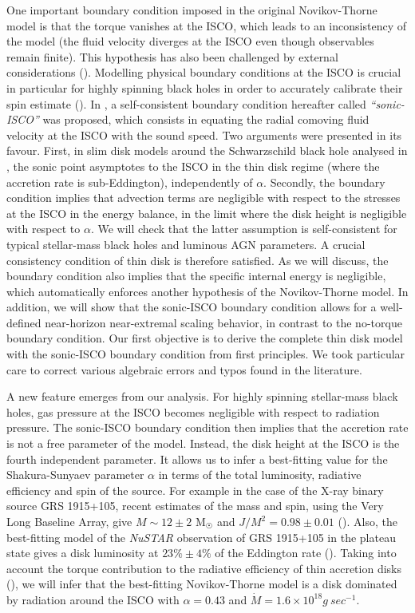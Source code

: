 \documentclass[a4paper,fleqn,usenatbib]{mnrasMOD}
\numberwithin{equation}{section}
\begin{document}
One important boundary condition imposed in the original Novikov-Thorne model is that the torque vanishes at the ISCO, which leads to an inconsistency of the model (the fluid velocity diverges at the ISCO even though observables remain finite). This hypothesis has also been challenged by external considerations (\cite{1999ApJ...515L..73K,1999ApJ...522L..57G,2000ApJ...533L.115L,2010ApJ...711..959N}). Modelling physical boundary conditions at the ISCO is crucial in particular for highly spinning black holes in order to accurately calibrate their spin estimate (\cite{Li:2004aq}).  In \cite{Penna:2011rw}, a self-consistent boundary condition hereafter called \emph{``sonic-ISCO''} was proposed, which consists in equating the radial comoving fluid velocity at the ISCO with the sound speed. Two arguments were presented in its favour. First, in slim disk models around the Schwarzschild black hole analysed in \cite{Abramowicz:2010nk}, the sonic point asymptotes to the ISCO in the thin disk regime (where the accretion rate is sub-Eddington), independently of $\alpha$. Secondly, the boundary condition implies that advection terms are negligible with respect to the stresses at the ISCO in the energy balance, in the limit where the disk height is negligible with respect to $\alpha$. We will check that the latter assumption is self-consistent for typical stellar-mass black holes and luminous AGN parameters. A crucial consistency condition of thin disk is therefore satisfied. As we will discuss, the boundary condition also implies that the specific internal energy is negligible, which automatically enforces another hypothesis of the Novikov-Thorne model. In addition, we will show that the sonic-ISCO boundary condition allows for a well-defined near-horizon near-extremal scaling behavior, in contrast to the no-torque boundary condition. Our first objective is to derive the complete thin disk model with the sonic-ISCO boundary condition from first principles. We took particular care to correct various algebraic errors and typos found in the literature. 

A new feature emerges from our analysis. For highly spinning stellar-mass black holes, gas pressure at the ISCO becomes negligible with respect to radiation pressure. The sonic-ISCO boundary condition then implies that the accretion rate is not a free parameter of the model. Instead, the disk height at the ISCO is the fourth independent parameter. It allows us to infer a best-fitting value for the Shakura-Sunyaev parameter $\alpha$ in terms of the total luminosity, radiative efficiency and spin of the source. For example in the case of the X-ray binary source GRS 1915+105, recent estimates of the mass and spin, using the Very Long Baseline Array, give $M \sim 12 \pm 2$ M$_{\astrosun}$ and $J/M^2=0.98 \pm 0.01$  (\cite{Reid:2014ywa}). Also, the best-fitting model of the \emph{NuSTAR} observation of GRS 1915+105 in the plateau state gives a disk luminosity at $23\% \pm 4 \%$ of the Eddington rate  (\cite{2041-8205-775-2-L45}). Taking into account the torque contribution to the radiative efficiency of thin accretion disks (\cite{2002ApJ...567..463L}), we will infer that the best-fitting Novikov-Thorne model is a disk dominated by radiation around the ISCO with $\alpha =0.43$ and $\dot M =1.6 \times 10^{18} g\ sec^{-1}$.
\end{document}

